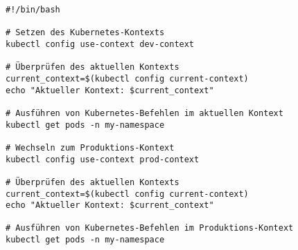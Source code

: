 \begin{verbatim}
#!/bin/bash

# Setzen des Kubernetes-Kontexts
kubectl config use-context dev-context

# Überprüfen des aktuellen Kontexts
current_context=$(kubectl config current-context)
echo "Aktueller Kontext: $current_context"

# Ausführen von Kubernetes-Befehlen im aktuellen Kontext
kubectl get pods -n my-namespace

# Wechseln zum Produktions-Kontext
kubectl config use-context prod-context

# Überprüfen des aktuellen Kontexts
current_context=$(kubectl config current-context)
echo "Aktueller Kontext: $current_context"

# Ausführen von Kubernetes-Befehlen im Produktions-Kontext
kubectl get pods -n my-namespace
\end{verbatim}